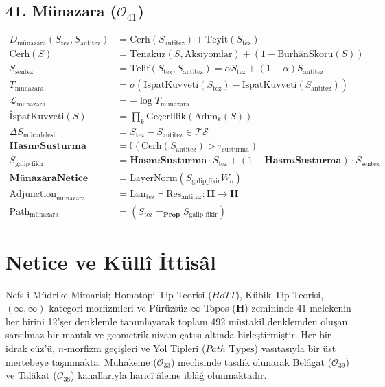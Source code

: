 \documentclass[11pt, a4paper]{article}
\begin{document}
\subsection{41. Münazara ($\mathcal{O}_{41}$)}
\begin{align}
D_{\text{münazara}}(S_{\text{tez}}, S_{\text{antitez}}) &= \text{Cerh}(S_{\text{antitez}}) + \text{Teyit}(S_{\text{tez}}) \\
\text{Cerh}(S) &= \text{Tenakuz}(S, \text{Aksiyomlar}) + (1 - \text{BurhânSkoru}(S)) \\
S_{\text{sentez}} &= \text{Telif}(S_{\text{tez}}, S_{\text{antitez}}) = \alpha S_{\text{tez}} + (1-\alpha) S_{\text{antitez}} \\
T_{\text{münazara}} &= \sigma\left( \text{İspatKuvveti}(S_{\text{tez}}) - \text{İspatKuvveti}(S_{\text{antitez}}) \right) \\
\mathcal{L}_{\text{münazara}} &= -\log T_{\text{münazara}} \\
\text{İspatKuvveti}(S) &= \prod_{k} \text{Geçerlilik}(\text{Adım}_k(S)) \\
\Delta S_{\text{mücadelesi}} &= S_{\text{tez}} - S_{\text{antitez}} \in \mathcal{T}\mathcal{S} \\
\mathbf{HasmıSusturma} &= \mathbb{I}(\text{Cerh}(S_{\text{antitez}}) > \tau_{\text{susturma}}) \\
S_{\text{galip\_fikir}} &= \mathbf{HasmıSusturma} \cdot S_{\text{tez}} + (1 - \mathbf{HasmıSusturma}) \cdot S_{\text{sentez}} \\
\mathbf{MünazaraNetice} &= \text{LayerNorm}(S_{\text{galip\_fikir}} W_o) \\
\text{Adjunction}_{\text{münazara}} &= \text{Lan}_{\text{tez}} \dashv \text{Res}_{\text{antitez}} : \mathbf{H} \to \mathbf{H} \\
\text{Path}_{\text{münazara}} &= (S_{\text{tez}} =_{\mathbf{Prop}} S_{\text{galip\_fikir}})
\end{align}

\section{Netice ve Küllî İttisâl}

Nefs-i Müdrike Mimarisi; Homotopi Tip Teorisi ($HoTT$), Kübik Tip Teorisi, $(\infty, \infty)$-kategori morfizmleri ve Pürüzsüz $\infty$-Topos ($\mathbf{H}$) zemininde 41 melekenin her birini 12'şer denklemle tanımlayarak toplam 492 müstakil denklemden oluşan sarsılmaz bir mantık ve geometrik nizam çatısı altında birleştirmiştir. Her bir idrak cüz'ü, $n$-morfizm geçişleri ve Yol Tipleri ($Path\text{ Types}$) vasıtasıyla bir üst mertebeye taşınmakta; Muhakeme ($\mathcal{O}_{33}$) meclisinde tasdik olunarak Belâgat ($\mathcal{O}_{39}$) ve Talâkat ($\mathcal{O}_{38}$) kanallarıyla haricî âleme iblâğ olunmaktadır.
\end{document}
